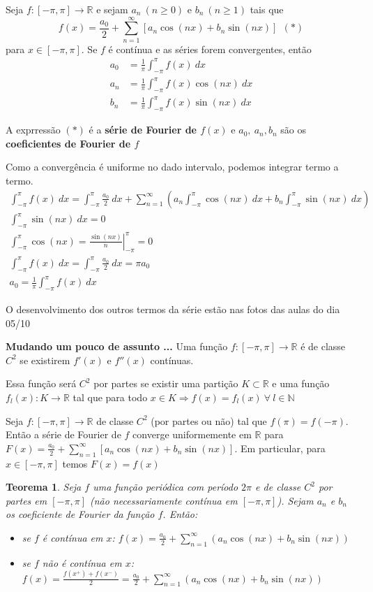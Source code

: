 \documentclass[12pt,openany, letterpaper]{book}
\newtheorem{theorem}{Teorema}[section]
\newcommand{\soma}[2][n]{\sum_{{#1} = #2}^\infty}
\newcommand{\IP}{\int_{-\pi}^{\pi}}
\begin{document}
{{Seja $f:[-\pi,\pi] \rightarrow \mathds{R}$ e sejam $a_n \ (n \geq 0)$ e $b_n \ (n \geq 1)$ tais que $$f(x) = \frac{a_0}{2} + \soma{1} [a_n\cos (nx) + b_n \sin (nx)] \ \ (*)$$ para $x \in [-\pi,\pi]$. Se $f$ é contínua e as séries forem convergentes, então \begin{align}
    a_0 &= \frac{1}{\pi}\int_{-\pi}^\pi f(x) \ dx \\
    a_n &= \frac{1}{\pi}\int_{-\pi}^\pi f(x)\cos (nx) \ dx \\
    b_n &= \frac{1}{\pi}\int_{-\pi}^\pi f(x)\sin (nx) \ dx
\end{align}

A exprressão $(*)$ é a \textbf{série de Fourier de $f(x)$} e $a_0, \ a_n, b_n$ são os \textbf{coeficientes de Fourier de $f$} 

Como a convergência é uniforme no dado intervalo, podemos integrar termo a termo. \begin{align*}
    \IP f(x) \ dx = \IP \frac{a_0}{2} \ dx + \soma{1} \left( a_n \IP \cos (nx) \ dx + b_n \IP \sin (nx) \ dx \right) \\
    \IP \sin (nx) \ dx = 0 \\
    \IP \cos (nx) = \left. \frac{\sin (nx)}{n}\right|_{-\pi}^\pi = 0 \\
    \IP f(x) \ dx = \IP \frac{a_0}{2} \ dx = \pi a_0 \\
    a_0 = \frac{1}{\pi}\IP f(x) \ dx
\end{align*}

O desenvolvimento dos outros termos da série estão nas fotos das aulas do dia 05/10

\textbf{Mudando um pouco de assunto ...} Uma função $f:[-\pi,\pi] \rightarrow \mathds{R}$ é de classe $C^2$ se existirem $f'(x)$ e $f''(x)$ contínuas. 

Essa função será $C^2$ por partes se existir uma partição $K \subset \mathds{R}$ e uma função $f_l(x):K \rightarrow \mathds{R}$ tal que para todo $x \in K \Rightarrow f(x) = f_l(x) \ \forall \ l \in \mathds{N}$

Seja $f:[-\pi,\pi] \rightarrow \mathds{R}$ de classe $C^2$ (por partes ou não) tal que $f(\pi) = f(-\pi)$. Então a série de Fourier de $f$ converge uniformemente em $\mathds{R}$ para $\displaystyle{F(x) = \frac{a_0}{2} + \soma{1} [a_n \cos (nx) + b_n \sin (nx)]}$. Em particular, para $x \in [-\pi, \pi]$ temos $F(x) = f(x)$

\begin{theorem}
Seja $f$ uma função periódica com período $2\pi$ e de classe $C^2$ por partes em $[-\pi,\pi]$ (não necessariamente contínua em $[-\pi,\pi]$). Sejam $a_n$ e $b_n$ os coeficiente de Fourier da função $f$. Então: \begin{itemize}
    \item se $f$ é contínua em $x$: $\displaystyle{f(x) = \frac{a_0}{2} + \soma{1} (a_n \cos (nx) + b_n \sin (nx))}$
    \item se $f$ não é contínua em $x$: $\displaystyle{f(x) = \frac{f(x^+) + f(x^-)}{2} = \frac{a_0}{2} + \soma{1} (a_n \cos (nx) + b_n \sin (nx))}$
\end{itemize}
\end{theorem}

}}
\end{document}
